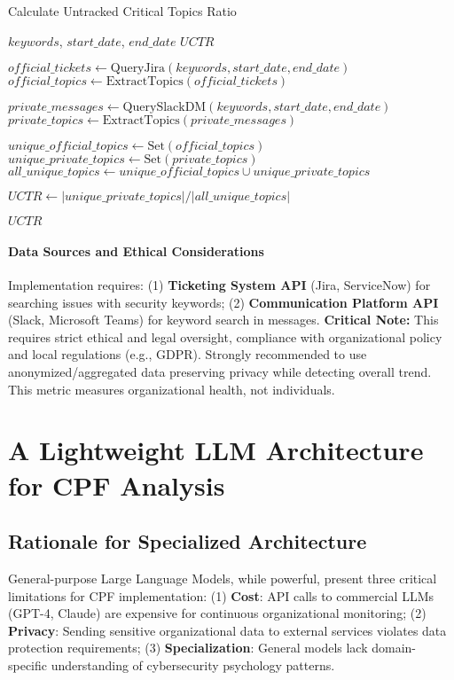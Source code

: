 \documentclass[11pt, a4paper]{article}
\begin{document}
\begin{algorithm}[H]
\caption{Calculate Untracked Critical Topics Ratio}
\begin{algorithmic}[1]
\Require $keywords$, $start\_date$, $end\_date$
\Ensure $UCTR$

\State $official\_tickets \gets \text{QueryJira}(keywords, start\_date, end\_date)$
\State $official\_topics \gets \text{ExtractTopics}(official\_tickets)$ 

\State $private\_messages \gets \text{QuerySlackDM}(keywords, start\_date, end\_date)$
\State $private\_topics \gets \text{ExtractTopics}(private\_messages)$

\State $unique\_official\_topics \gets \text{Set}(official\_topics)$
\State $unique\_private\_topics \gets \text{Set}(private\_topics)$
\State $all\_unique\_topics \gets unique\_official\_topics \cup unique\_private\_topics$

\State $UCTR \gets |unique\_private\_topics| / |all\_unique\_topics|$

\State \Return $UCTR$
\end{algorithmic}
\end{algorithm}

\paragraph{Data Sources and Ethical Considerations}
Implementation requires: (1) \textbf{Ticketing System API} (Jira, ServiceNow) for searching issues with security keywords; (2) \textbf{Communication Platform API} (Slack, Microsoft Teams) for keyword search in messages. \textbf{Critical Note:} This requires strict ethical and legal oversight, compliance with organizational policy and local regulations (e.g., GDPR). Strongly recommended to use anonymized/aggregated data preserving privacy while detecting overall trend. This metric measures organizational health, not individuals.

\section{A Lightweight LLM Architecture for CPF Analysis}
\label{sec:llm_architecture}

\subsection{Rationale for Specialized Architecture}

General-purpose Large Language Models, while powerful, present three critical limitations for CPF implementation: (1) \textbf{Cost}: API calls to commercial LLMs (GPT-4, Claude) are expensive for continuous organizational monitoring; (2) \textbf{Privacy}: Sending sensitive organizational data to external services violates data protection requirements; (3) \textbf{Specialization}: General models lack domain-specific understanding of cybersecurity psychology patterns.
\end{document}
